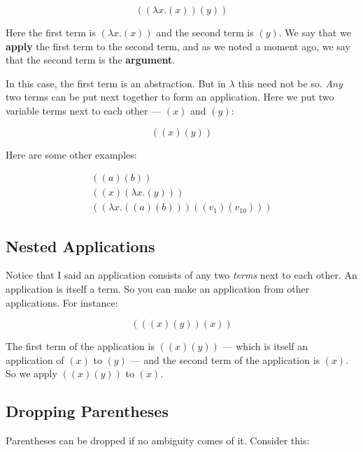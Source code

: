 \documentclass{book}
\numberwithin{equation}{chapter}
\newcommand{\vocab}{\textbf}
\begin{document}
\begin{equation}
((\lambda x.(x)) (y))
\end{equation}

\noindent
Here the first term is $(\lambda x.(x))$ and the second term is $(y)$. We say that we \vocab{apply} the first term to the second term, and as we noted a moment ago, we say that the second term is the \vocab{argument}.

In this case, the first term is an abstraction. But in $\lambda$ this need not be so. \textit{Any} two terms can be put next together to form an application. Here we put two variable terms next to each other --- $(x)$ and $(y)$:

\begin{equation}
((x) (y))
\end{equation}

\noindent
Here are some other examples:

\begin{align}
((a) (b)) \\
((x) (\lambda x.(y))) \\
((\lambda x.((a)(b))) ((v_{1}) (v_{10})))
\end{align}


\subsection{Nested Applications}

Notice that I said an application consists of any two \textit{terms} next to each other. An application is itself a term. So you can make an application from other applications. For instance:

\begin{equation}
(((x) (y)) (x))
\end{equation}

\noindent
The first term of the application is $((x) (y))$ --- which is itself an application of $(x)$ to $(y)$ --- and the second term of the application is $(x)$. So we apply $((x)(y))$ to $(x)$.


\subsection{Dropping Parentheses}

Parentheses can be dropped if no ambiguity comes of it. Consider this:
\end{document}
